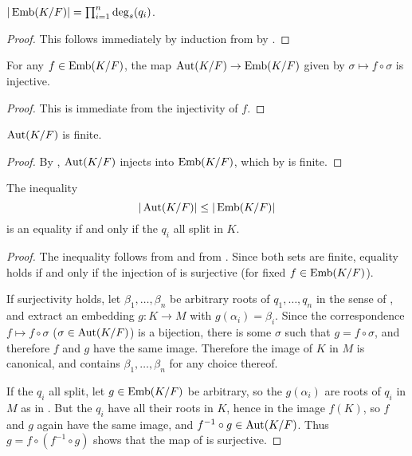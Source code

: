 \begin{corollary} $|\operatorname{\text{Emb}}(K/F)| = \prod_{i = 1}^n \deg_s(q_i)$.
\label{emb_size}
\end{corollary}

\begin{proof} This follows immediately by induction from  by
. \end{proof}

\begin{lemma} For any $f \in \operatorname{\text{Emb}}(K/F)$, the map $\operatorname{\text{Aut}}(K/F) \to \operatorname{\text{Emb}}(K/F)$ given
by $\sigma \mapsto f \circ \sigma$ is injective.  
\label{aut_inj}
\end{lemma}

\begin{proof} This is immediate from the injectivity of $f$. \end{proof}

\begin{corollary} $\operatorname{\text{Aut}}(K/F)$ is finite.
\label{aut_fin}
\end{corollary}

\begin{proof} By , $\operatorname{\text{Aut}}(K/F)$ injects into $\operatorname{\text{Emb}}(K/F)$, which by
 is finite. \end{proof}

\begin{proposition} The inequality
\begin{equation*}
|\operatorname{\text{Aut}}(K/F)| \leq |\operatorname{\text{Emb}}(K/F)|
\end{equation*}
is an equality if and only if the $q_i$ all split in $K$.
\label{aut_ineq}
\end{proposition}

\begin{proof} The inequality follows from  and from .
Since both sets are finite, equality holds if and only if the injection of
 is surjective (for fixed $f \in \operatorname{\text{Emb}}(K/F)$).

If surjectivity holds, let $\beta_1, \dots, \beta_n$ be arbitrary roots of
$q_1, \dots, q_n$ in the sense of , and extract an embedding $g
\colon K \to M$ with $g(\alpha_i) = \beta_i$.  Since the correspondence $f
\mapsto f \circ \sigma$ ($\sigma \in \operatorname{\text{Aut}}(K/F)$) is a bijection, there is some
$\sigma$ such that $g = f \circ \sigma$, and therefore $f$ and $g$ have the
same image.  Therefore the image of $K$ in $M$ is canonical, and contains
$\beta_1, \dots, \beta_n$ for any choice thereof.

If the $q_i$ all split, let $g \in \operatorname{\text{Emb}}(K/F)$ be arbitrary, so the
$g(\alpha_i)$ are roots of $q_i$ in $M$ as in .  But the $q_i$
have all their roots in $K$, hence in the image $f(K)$, so $f$ and $g$ again
have the same image, and $f^{-1} \circ g \in \operatorname{\text{Aut}}(K/F)$.  Thus $g = f \circ
(f^{-1} \circ g)$ shows that the map of  is surjective.
\end{proof}

